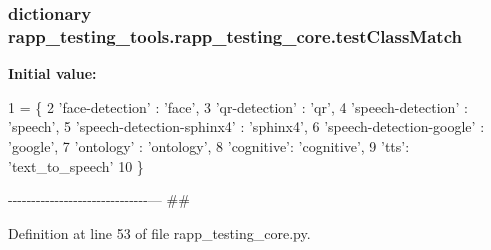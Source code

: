 \hypertarget{namespacerapp__testing__tools_1_1rapp__testing__core_ac313ca7f9bb54dca62d4718d91709bb7}{
\subsubsection[{test\-Class\-Match}]{\setlength{\rightskip}{0pt plus 5cm}dictionary rapp\-\_\-testing\-\_\-tools.\-rapp\-\_\-testing\-\_\-core.\-test\-Class\-Match}}\label{namespacerapp__testing__tools_1_1rapp__testing__core_ac313ca7f9bb54dca62d4718d91709bb7}
{\bfseries Initial value\-:}
\begin{DoxyCode}
1 = \{
2     \textcolor{stringliteral}{'face-detection'} : \textcolor{stringliteral}{'face'},
3     \textcolor{stringliteral}{'qr-detection'} : \textcolor{stringliteral}{'qr'},
4     \textcolor{stringliteral}{'speech-detection'} : \textcolor{stringliteral}{'speech'},
5     \textcolor{stringliteral}{'speech-detection-sphinx4'} : \textcolor{stringliteral}{'sphinx4'},
6     \textcolor{stringliteral}{'speech-detection-google'} : \textcolor{stringliteral}{'google'},
7     \textcolor{stringliteral}{'ontology'} : \textcolor{stringliteral}{'ontology'},
8     \textcolor{stringliteral}{'cognitive'}: \textcolor{stringliteral}{'cognitive'},
9     \textcolor{stringliteral}{'tts'}: \textcolor{stringliteral}{'text\_to\_speech'}
10 \}
\end{DoxyCode}


-\/-\/-\/-\/-\/-\/-\/-\/-\/-\/-\/-\/-\/-\/-\/-\/-\/-\/-\/-\/-\/-\/-\/-\/-\/-\/-\/-\/-\/-\/--- \#\# 



Definition at line 53 of file rapp\-\_\-testing\-\_\-core.\-py.

